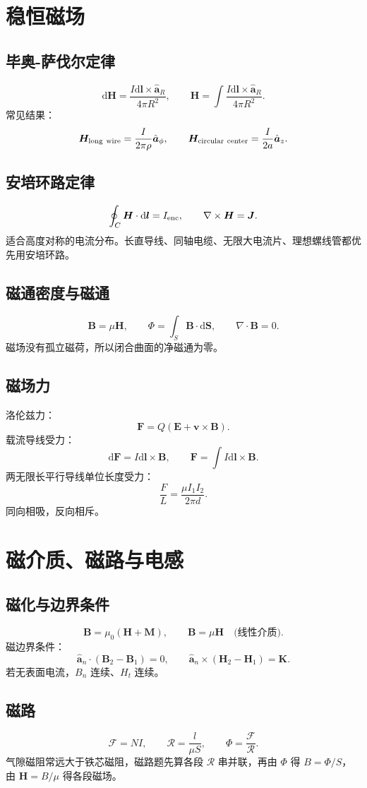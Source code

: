 \documentclass[11pt,a4paper]{ctexart}
\newcommand{\dd}{\mathrm{d}}
\newcommand{\uv}[1]{\hat{\bm a}_{#1}}
\newcommand{\E}{\bm E}
\newcommand{\B}{\bm B}
\newcommand{\Hf}{\bm H}
\newcommand{\J}{\bm J}
\newcommand{\K}{\bm K}
\newcommand{\M}{\bm M}
\newcommand{\curl}{\nabla\times}
\newcommand{\divg}{\nabla\cdot}
\begin{document}
\section{稳恒磁场}
\subsection{毕奥-萨伐尔定律}
\[
\dd\Hf=\frac{I\dd\bm l\times\uv R}{4\pi R^2},\qquad
\Hf=\int \frac{I\dd\bm l\times\uv R}{4\pi R^2}.
\]
常见结果：
\[
\Hf_{\rm long\ wire}=\frac{I}{2\pi\rho}\uv\phi,\qquad
\Hf_{\rm circular\ center}=\frac{I}{2a}\uv z.
\]

\subsection{安培环路定律}
\[
\oint_C \Hf\cdot\dd\bm l=I_{\rm enc},\qquad
\curl\Hf=\J.
\]
适合高度对称的电流分布。长直导线、同轴电缆、无限大电流片、理想螺线管都优先用安培环路。

\subsection{磁通密度与磁通}
\[
\B=\mu\Hf,\qquad \Phi=\int_S\B\cdot\dd\bm S,\qquad \divg\B=0.
\]
磁场没有孤立磁荷，所以闭合曲面的净磁通为零。

\subsection{磁场力}
洛伦兹力：
\[
\bm F=Q(\E+\bm v\times\B).
\]
载流导线受力：
\[
\dd\bm F=I\dd\bm l\times\B,\qquad \bm F=\int I\dd\bm l\times\B.
\]
两无限长平行导线单位长度受力：
\[
\frac{F}{L}=\frac{\mu I_1I_2}{2\pi d}.
\]
同向相吸，反向相斥。

\section{磁介质、磁路与电感}
\subsection{磁化与边界条件}
\[
\B=\mu_0(\Hf+\M),\qquad \B=\mu\Hf\quad\text{(线性介质)}.
\]
磁边界条件：
\[
\uv n\cdot(\B_2-\B_1)=0,\qquad
\uv n\times(\Hf_2-\Hf_1)=\K.
\]
若无表面电流，$B_n$ 连续、$H_t$ 连续。

\subsection{磁路}
\[
\mathcal F=NI,\qquad \mathcal R=\frac{l}{\mu S},\qquad
\Phi=\frac{\mathcal F}{\mathcal R}.
\]
气隙磁阻常远大于铁芯磁阻，磁路题先算各段 $\mathcal R$ 串并联，再由 $\Phi$ 得 $B=\Phi/S$，由 $\Hf=B/\mu$ 得各段磁场。
\end{document}
